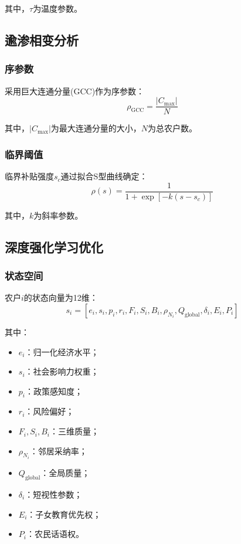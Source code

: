 \documentclass[12pt,a4paper]{article}
\numberwithin{equation}{section}
\begin{document}
其中，$\tau$为温度参数。

\subsection{逾渗相变分析}

\subsubsection{序参数}

采用巨大连通分量(GCC)作为序参数：
\begin{equation}
\rho_{\text{GCC}} = \frac{|C_{\max}|}{N}
\label{eq:order_parameter}
\end{equation}

其中，$|C_{\max}|$为最大连通分量的大小，$N$为总农户数。

\subsubsection{临界阈值}

临界补贴强度$s_c$通过拟合S型曲线确定：
\begin{equation}
\rho(s) = \frac{1}{1 + \exp[-k(s - s_c)]}
\label{eq:critical_threshold}
\end{equation}

其中，$k$为斜率参数。

\subsection{深度强化学习优化}

\subsubsection{状态空间}

农户$i$的状态向量为12维：
\begin{equation}
s_i = [e_i, s_i, p_i, r_i, F_i, S_i, B_i, \rho_{N_i}, Q_{\text{global}}, \delta_i, E_i, P_i]
\label{eq:state_vector}
\end{equation}

其中：
\begin{itemize}
    \item $e_i$：归一化经济水平；
    \item $s_i$：社会影响力权重；
    \item $p_i$：政策感知度；
    \item $r_i$：风险偏好；
    \item $F_i, S_i, B_i$：三维质量；
    \item $\rho_{N_i}$：邻居采纳率；
    \item $Q_{\text{global}}$：全局质量；
    \item $\delta_i$：短视性参数；
    \item $E_i$：子女教育优先权；
    \item $P_i$：农民话语权。
\end{itemize}
\end{document}
